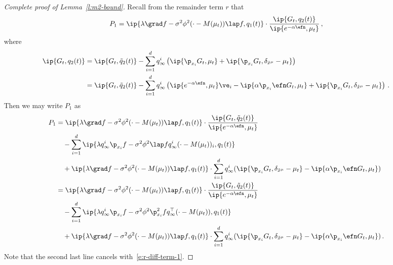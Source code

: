 \documentclass{amsart}
\begin{document}
\begin{proof}[Complete proof of Lemma~\ref{l:m2-bound}]
	Recall from the remainder term $r$ that 
	\begin{equation*}
		P_1 = \ip{\lambda \grad f - \sigma^2 \phi^2 (\cdot-M(\mu_t)) \lap f, q_1(t)} \cdot \frac{\ip{G_t, q_2(t)}}{\ip{e^{-\alpha\efn}, \mu_t}} \,,
	\end{equation*}
	where 
	\begin{align*}
		\ip{G_t, q_2(t)} & = \ip{G_t, \tilde q_2(t)} - \sum_{i=1}^d q_\infty^i \left( \ip{\p_{x_i} G_t, \mu_t} + \ip{\p_{x_i} G_t, \delta_{\tilde x^\mu} - \mu_t} \right)  \\
		& = \ip{G_t, \tilde q_2(t)} - \sum_{i=1}^d q_\infty^i \left( \ip{e^{-\alpha\efn}, \mu_t} \ve_i - \ip{\alpha \p_{x_i} \efn G_t, \mu_t} + \ip{\p_{x_i} G_t, \delta_{\tilde x^\mu} - \mu_t} \right) \,.
	\end{align*}
	Then we may write $P_1$ as 
	\begin{align*}
		P_1 & = \ip{\lambda \grad f - \sigma^2 \phi^2 (\cdot-M(\mu_t)) \lap f, q_1(t)} \cdot \frac{\ip{G_t, \tilde q_2(t)}}{\ip{e^{-\alpha\efn}, \mu_t}} \\
		& \quad - \sum_{i=1}^d \ip{\lambda q_\infty^i \p_{x_i} f - \sigma^2 \phi^2 \lap f q_\infty^i (\cdot-M(\mu_t))_i, q_1(t) } \\
		& \quad + \ip{\lambda \grad f - \sigma^2 \phi^2 (\cdot-M(\mu_t)) \lap f, q_1(t)} \cdot \sum_{i=1}^d q_\infty^i (\ip{\p_{x_i} G_t, \delta_{\tilde x^\mu} - \mu_t} - \ip{\alpha \p_{x_i} \efn G_t, \mu_t}) \\
		& = \ip{\lambda \grad f - \sigma^2 \phi^2 (\cdot-M(\mu_t)) \lap f, q_1(t)} \cdot \frac{\ip{G_t, \tilde q_2(t)}}{\ip{e^{-\alpha\efn}, \mu_t}} \\
		& \quad - \sum_{i=1}^d \ip{\lambda q_\infty^i \p_{x_i} f - \sigma^2 \phi^2 \p_{x_i}^2 f q_\infty^\top (\cdot-M(\mu_t)), q_1(t) } \\
		& \quad + \ip{\lambda \grad f - \sigma^2 \phi^2 (\cdot-M(\mu_t)) \lap f, q_1(t)} \cdot \sum_{i=1}^d q_\infty^i (\ip{\p_{x_i} G_t, \delta_{\tilde x^\mu} - \mu_t} - \ip{\alpha \p_{x_i} \efn G_t, \mu_t}) \,.
	\end{align*}
	Note that the second last line cancels with~\eqref{e:r-diff-term-1}.


\end{proof}
\end{document}
